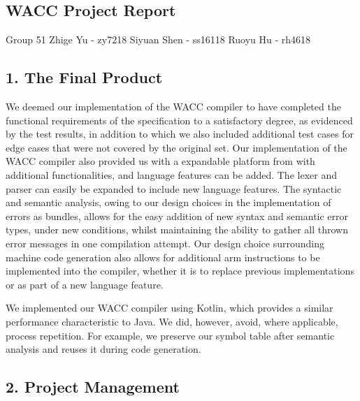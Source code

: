 \documentclass[10pt,a4paper,]{report}
\begin{document}
  \begin{center}
    \section*{WACC Project Report}
    Group 51  Zhige Yu - zy7218  Siyuan Shen - ss16118  Ruoyu Hu - rh4618
  \end{center}

  \subsection*{1. The Final Product}

  We deemed our implementation of the WACC compiler to have completed the
  functional requirements of the specification to a satisfactory degree, as
  evidenced by the test results, in addition to which we also included
  additional test cases for edge cases that were not covered by the original set.
  Our implementation of the WACC compiler also provided us with a expandable
  platform from with additional functionalities, and language features can be
  added. The lexer and parser can easily be expanded to include new language
  features. The syntactic and semantic analysis, owing to our design choices in
  the implementation of errors as bundles, allows for the easy addition of new
  syntax and semantic error types, under new conditions, whilst maintaining the
  ability to gather all thrown error messages in one compilation attempt.
  Our design choice surrounding machine code generation also allows for
  additional arm instructions to be implemented into the compiler, whether it is
  to replace previous implementations or as part of a new language feature.

  We implemented our WACC compiler using Kotlin, which provides a similar
  performance characteristic to Java. We did, however, avoid, where applicable,
  process repetition. For example, we preserve our symbol table after semantic
  analysis and reuses it during code generation.


  \subsection*{2. Project Management}
\end{document}
